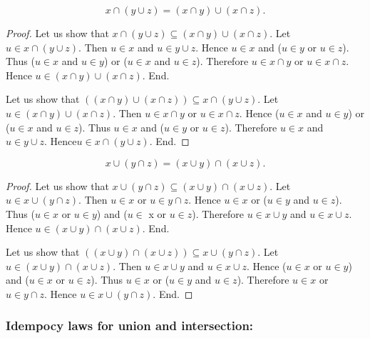 \documentclass[../../set-theory.tex]{subfiles}
\begin{document}
  \begin{forthel}
    \begin{proposition}\label{SetTheory_01_01_106755}
      \[ x \cap (y \cup z) = (x \cap y) \cup (x \cap z). \]
    \end{proposition}
    \begin{proof}
      Let us show that $x \cap (y \cup z) \subseteq (x \cap y) \cup (x \cap z)$.
        Let $u \in x \cap (y \cup z)$.
        Then $u \in x$ and $u \in y \cup z$.
        Hence $u \in x$ and ($u \in y$ or $u \in z$).
        Thus ($u \in x$ and $u \in y$) or ($u \in x$ and $u \in z$).
        Therefore $u \in x \cap y$ or $u \in x \cap z$.
        Hence $u \in (x \cap y) \cup (x \cap z)$.
      End.

      Let us show that $((x \cap y) \cup (x \cap z)) \subseteq x \cap (y \cup z)$.
        Let $u \in (x \cap y) \cup (x \cap z)$.
        Then $u \in x \cap y$ or $u \in x \cap z$.
        Hence ($u \in x$ and $u \in y$) or ($u \in x$ and $u \in z$).
        Thus $u \in x$ and ($u \in y$ or $u \in z$).
        Therefore $u \in x$ and $u \in y \cup z$.
        Hence$ u \in x \cap (y \cup z)$.
      End.
    \end{proof}

    \begin{proposition}\label{SetTheory_01_01_836290}
      \[ x \cup (y \cap z) = (x \cup y) \cap (x \cup z). \]
    \end{proposition}
    \begin{proof}
      Let us show that $x \cup (y \cap z) \subseteq (x \cup y) \cap (x \cup z)$.
        Let $u \in x \cup (y \cap z)$.
        Then $u \in x$ or $u \in y \cap z$.
        Hence $u \in x$ or ($u \in y$ and $u \in z$).
        Thus ($u \in x$ or $u \in y$) and ($u \in$ x or $u \in z$).
        Therefore $u \in x \cup y$ and $u \in x \cup z$.
        Hence $u \in (x \cup y) \cap (x \cup z)$.
      End.

      Let us show that $((x \cup y) \cap (x \cup z)) \subseteq x \cup (y \cap z)$.
        Let $u \in (x \cup y) \cap (x \cup z)$.
        Then $u \in x \cup y$ and $u \in x \cup z$.
        Hence ($u \in x$ or $u \in y$) and ($u \in x$ or $u \in z$).
        Thus $u \in x$ or ($u \in y$ and $u \in z$).
        Therefore $u \in x$ or $u \in y \cap z$.
        Hence $u \in x \cup (y \cap z)$.
      End.
    \end{proof}
  \end{forthel}


  \subsubsection*{Idempocy laws for union and intersection:}
\end{document}
